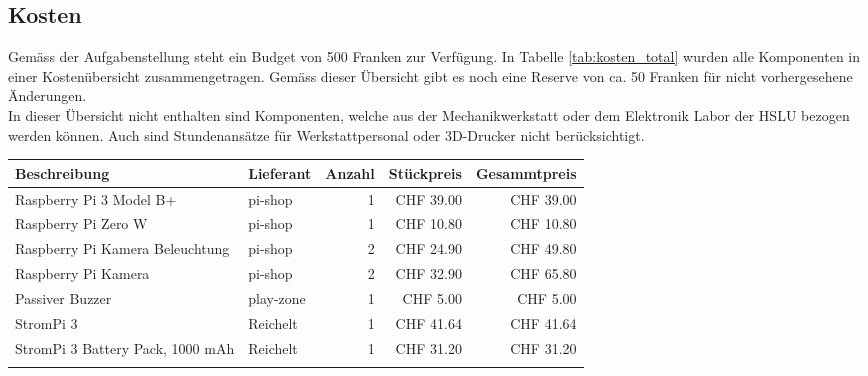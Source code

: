 \documentclass[../../main.tex]{subfiles}
\begin{document}
\subsection{Kosten}
Gemäss der Aufgabenstellung steht ein Budget von 500 Franken zur Verfügung. In Tabelle \ref{tab:kosten_total} wurden alle Komponenten in einer Kostenübersicht zusammengetragen. Gemäss dieser Übersicht gibt es noch eine Reserve von ca. 50 Franken für nicht vorhergesehene Änderungen.\\
In dieser Übersicht nicht enthalten sind Komponenten, welche aus der Mechanikwerkstatt oder dem Elektronik Labor der
HSLU bezogen werden können. Auch sind Stundenansätze für Werkstattpersonal oder 3D-Drucker nicht berücksichtigt. \\

\begin{table}[H] \centering
    \begin{tabular}{|p{6cm}|l|r|r|r|}
    \hline
    \textbf{Beschreibung}                                   & \textbf{Lieferant} & \textbf{Anzahl} & \textbf{Stückpreis} & \textbf{Gesammtpreis} \\ \hline
    Raspberry Pi 3 Model B+                                 & pi-shop            & 1               & CHF 39.00           & CHF 39.00             \\ \hline \nocite{PiShopPi3ModelBp}
    Raspberry Pi Zero W                                     & pi-shop            & 1               & CHF 10.80           & CHF 10.80             \\ \hline \nocite{PiShopPiZero}
    Raspberry Pi Kamera Beleuchtung                         & pi-shop            & 2               & CHF 24.90           & CHF 49.80             \\ \hline \nocite{PiShopBrightPi}
    Raspberry Pi Kamera                                     & pi-shop            & 2               & CHF 32.90           & CHF 65.80             \\ \hline \nocite{PiShopPiKamera}
    Passiver Buzzer                                         & play-zone          & 1               & CHF 5.00            & CHF 5.00              \\ \hline \nocite{PlayZonePassiverBuzzer}
    StromPi 3                                               & Reichelt           & 1               & CHF 41.64           & CHF 41.64             \\ \hline \nocite{ReicheltStromPi}
    StromPi 3 Battery Pack, 1000 mAh                        & Reichelt           & 1               & CHF 31.20           & CHF 31.20             \\ \hline \nocite{ReicheltStromPiAkku}

\end{tabular}
\end{table}
\end{document}
